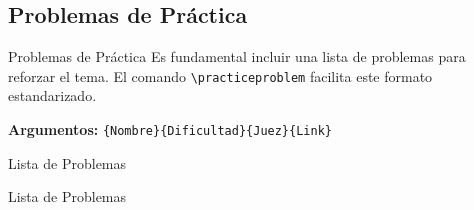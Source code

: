 \subsection{Problemas de Práctica}

\begin{frame}{Problemas de Práctica}
    Es fundamental incluir una lista de problemas para reforzar el tema. 
    El comando \texttt{\textbackslash practiceproblem} facilita este formato estandarizado.

    \vspace{0.3cm}
    \textbf{Argumentos:} \texttt{\{Nombre\}\{Dificultad\}\{Juez\}\{Link\}}
\end{frame}

\begin{frame}{Lista de Problemas}
    \begin{itemize}
    \end{itemize}
\end{frame}

\begin{frame}{Lista de Problemas}
    \begin{itemize}
    \end{itemize}
\end{frame}
